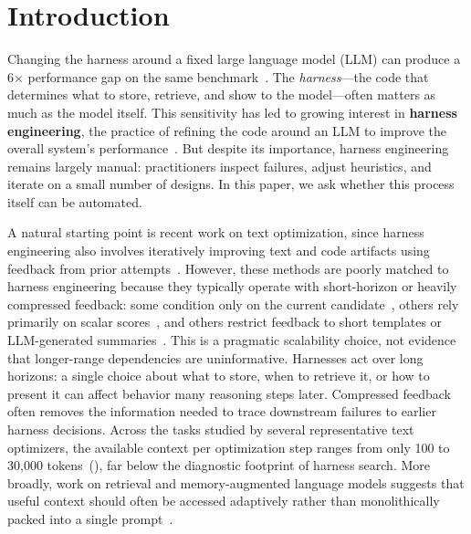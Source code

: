 \section{Introduction}
\label{sec:introduction}

Changing the harness around a fixed large language model (LLM) can produce a 6$\times$ performance gap on the same benchmark~\citep{Tian2026SWEBenchMC}.
The \textit{harness}---the code that determines what to store, retrieve, and show to the model---often matters as much as the model itself.
This sensitivity has led to growing interest in \textbf{harness engineering}, the practice of refining the code around an LLM to improve the overall system's performance~\citep {openai2026harnessengineering,young2025harness,boluk2026harnessproblem,bockeler2026harnessengineering}.
But despite its importance, harness engineering remains largely manual: practitioners inspect failures, adjust heuristics, and iterate on a small number of designs.
In this paper, we ask whether this process itself can be automated.

A natural starting point is recent work on text optimization, since harness engineering also involves iteratively improving text and code artifacts using feedback from prior attempts~\citep{pryzant2023protegi,romera2024mathematical,novikov2025alphaevolve,lee2025feedback,agrawal2025gepa}.
However, these methods are poorly matched to harness engineering because they typically operate with short-horizon or heavily compressed feedback: some condition only on the current candidate~\citep{madaan2023self,yang2023large,yuksekgonul2024textgradautomaticdifferentiationtext}, others rely primarily on scalar scores~\citep{novikov2025alphaevolve,cemri2026adaevolve}, and others restrict feedback to short templates or LLM-generated summaries~\citep{agrawal2025gepa,lee2025feedback}.
This is a pragmatic scalability choice, not evidence that longer-range dependencies are uninformative.
Harnesses act over long horizons: a single choice about what to store, when to retrieve it, or how to present it can affect behavior many reasoning steps later.
Compressed feedback often removes the information needed to trace downstream failures to earlier harness decisions.
Across the tasks studied by several representative text optimizers, the available context per optimization step ranges from only 100 to 30{,}000 tokens~(), far below the diagnostic footprint of harness search.
More broadly, work on retrieval and memory-augmented language models suggests that useful context should often be accessed adaptively rather than monolithically packed into a single prompt~\citep{lewis2020retrieval,trivedi2023interleavingretrievalchainofthoughtreasoning,packer2023memgpt,zhang2026recursivelanguagemodels}.

